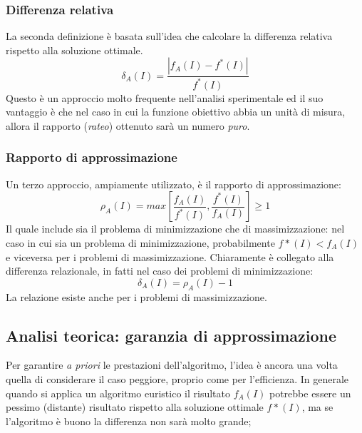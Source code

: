 \documentclass{article}
\begin{document}
\subsubsection{Differenza relativa}
La seconda definizione è basata sull'idea che calcolare la differenza relativa rispetto alla soluzione
ottimale.
$$\delta_A(I)=\frac{|f_A(I)-f^*(I)|}{f^*(I)}$$
Questo è un approccio molto frequente nell'analisi sperimentale ed il suo vantaggio è che nel caso in
cui la funzione obiettivo abbia un unità di misura, allora il rapporto (\textit{rateo}) ottenuto sarà
un numero \textit{puro}.

\subsubsection{Rapporto di approssimazione}
Un terzo approccio, ampiamente utilizzato, è il rapporto di approssimazione:
$$\rho_A(I)=max\left[\frac{f_A(I)}{f^*(I)},\frac{f^*(I)}{f_A(I)}\right]\geq 1$$
Il quale include sia il problema di minimizzazione che di massimizzazione: nel caso in cui sia un
problema di minimizzazione, probabilmente $f*(I)<f_A(I)$ e viceversa per i problemi di massimizzazione.
Chiaramente è collegato alla differenza relazionale, in fatti nel caso dei problemi di minimizzazione:
$$\delta_A(I)=\rho_A(I)-1$$
La relazione esiste anche per i problemi di massimizzazione.

\subsection{Analisi teorica: garanzia di approssimazione}
Per garantire \textit{a priori} le prestazioni dell'algoritmo, l'idea è ancora una volta quella
di considerare il caso peggiore, proprio come per l'efficienza. In generale quando si applica
un algoritmo euristico il risultato $f_A(I)$ potrebbe essere un pessimo (distante) risultato
rispetto alla soluzione ottimale $f*(I)$, ma se l'algoritmo è buono la differenza non sarà
molto grande;
\end{document}
